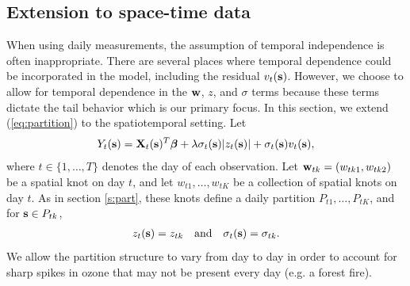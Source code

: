 \documentclass[11pt]{article}
\begin{document}
\subsection{Extension to space-time data} \label{s:temporal}
When using daily measurements, the assumption of temporal independence is often inappropriate.
There are several places where temporal dependence could be incorporated in the model, including the residual $v_t(\mbox{\bf s})$.
However, we choose to allow for temporal dependence in the $\mbox{\bf w}$, $z$, and $\sigma$ terms because these terms dictate the tail behavior which is our primary focus.
In this section, we extend (\ref{eq:partition}) to the spatiotemporal setting.
Let
\begin{align} \label{eq:spatiotemp}
  Y_t(\mbox{\bf s}) = \mbox{\bf X}_t(\mbox{\bf s})^T \mbox{\boldmath $\beta$} + \lambda \sigma_t(\mbox{\bf s}) |z_t(\mbox{\bf s})| + \sigma_t(\mbox{\bf s}) v_t(\mbox{\bf s}),
\end{align}
where $t \in \{1, \ldots, T\}$ denotes the day of each observation.
Let \hbox{$\mbox{\bf w}_{tk} = (w_{tk1}, w_{tk2})$} be a spatial knot on day $t$, and let $w_{t1}, \ldots, w_{tK}$ be a collection of spatial knots on day $t$.
As in section \ref{s:part}, these knots define a daily partition $P_{t1}, \ldots, P_{tK}$, and for $\mbox{\bf s} \in P_{tk}$,
\begin{align}
  z_t(\mbox{\bf s}) = z_{tk}\quad \text{and} \quad \sigma_{t}(\mbox{\bf s}) = \sigma_{tk}.
\end{align}
We allow the partition structure to vary from day to day in order to account for sharp spikes in ozone that may not be present every day (e.g. a forest fire).
\end{document}
